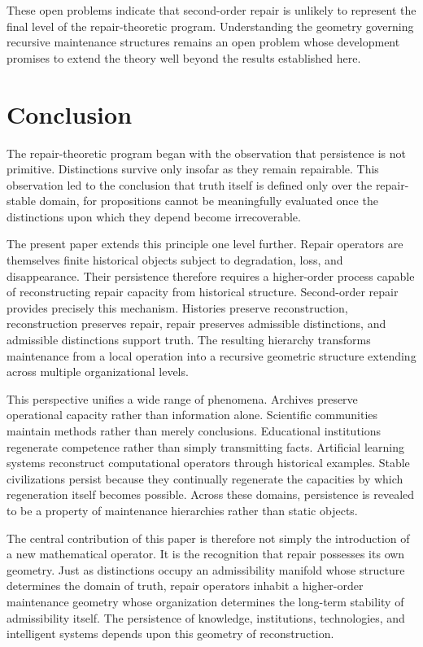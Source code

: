 \documentclass[12pt,oneside]{article}
\theoremstyle{plain}
\theoremstyle{definition}
\theoremstyle{remark}
\theoremstyle{plain}
\begin{document}
These open problems indicate that second-order repair is unlikely to represent the final level of
the repair-theoretic program. Understanding the geometry governing recursive maintenance structures
remains an open problem whose development promises to extend the theory well beyond the results
established here.

\section*{Conclusion}

The repair-theoretic program began with the observation that persistence is not primitive.
Distinctions survive only insofar as they remain repairable. This observation led to the conclusion
that truth itself is defined only over the repair-stable domain, for propositions cannot be
meaningfully evaluated once the distinctions upon which they depend become irrecoverable.

The present paper extends this principle one level further. Repair operators are themselves finite
historical objects subject to degradation, loss, and disappearance. Their persistence therefore
requires a higher-order process capable of reconstructing repair capacity from historical structure.
Second-order repair provides precisely this mechanism. Histories preserve reconstruction,
reconstruction preserves repair, repair preserves admissible distinctions, and admissible
distinctions support truth. The resulting hierarchy transforms maintenance from a local operation
into a recursive geometric structure extending across multiple organizational levels.

This perspective unifies a wide range of phenomena. Archives preserve operational capacity rather
than information alone. Scientific communities maintain methods rather than merely conclusions.
Educational institutions regenerate competence rather than simply transmitting facts. Artificial
learning systems reconstruct computational operators through historical examples. Stable
civilizations persist because they continually regenerate the capacities by which regeneration
itself becomes possible. Across these domains, persistence is revealed to be a property of
maintenance hierarchies rather than static objects.

The central contribution of this paper is therefore not simply the introduction of a new
mathematical operator. It is the recognition that repair possesses its own geometry. Just as
distinctions occupy an admissibility manifold whose structure determines the domain of truth,
repair operators inhabit a higher-order maintenance geometry whose organization determines the
long-term stability of admissibility itself. The persistence of knowledge, institutions,
technologies, and intelligent systems depends upon this geometry of reconstruction.
\end{document}

